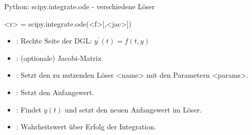 \documentclass[hyperref={xetex}]{beamer}
\begin{document}


\begin{frame}[fragile]{Python: scipy.integrate.ode - verschiedene Löser}
  \begin{pyin}
<r> = scipy.integrate.ode(<f>[,<jac>])
  \end{pyin}
\begin{itemize}
  \item {}: Rechte Seite der DGL: $y^\prime(t) = f(t,y)$ 
  \item {}: (optionale)  Jacobi-Matrix
  \item {}: Setzt den zu nutzenden Löser <name> mit den Parametern <params>.
  \item {}: Setzt den Anfangswert.
  \item {}: Findet $y(t)$ und setzt den neuen Anfangswert im Löser.
  \item {}: Wahrheitswert über Erfolg der Integration. 
\end{itemize}
\end{frame}
\end{document}
